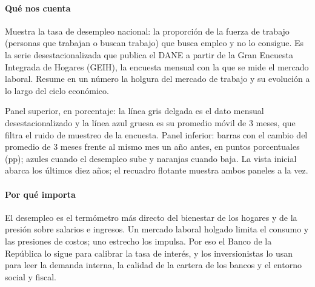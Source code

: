 \paragraph{Qué nos cuenta}
Muestra la tasa de desempleo nacional: la proporción de la fuerza de trabajo (personas que trabajan o buscan trabajo) que busca empleo y no lo consigue. Es la serie desestacionalizada que publica el DANE a partir de la Gran Encuesta Integrada de Hogares (GEIH), la encuesta mensual con la que se mide el mercado laboral. Resume en un número la holgura del mercado de trabajo y su evolución a lo largo del ciclo económico.

\begin{leer}
Panel superior, en porcentaje: la línea gris delgada es el dato mensual desestacionalizado y la línea azul gruesa es su promedio móvil de 3 meses, que filtra el ruido de muestreo de la encuesta. Panel inferior: barras con el cambio del promedio de 3 meses frente al mismo mes un año antes, en puntos porcentuales (pp); azules cuando el desempleo sube y naranjas cuando baja. La vista inicial abarca los últimos diez años; el recuadro flotante muestra ambos paneles a la vez.
\end{leer}

\paragraph{Por qué importa}
El desempleo es el termómetro más directo del bienestar de los hogares y de la presión sobre salarios e ingresos. Un mercado laboral holgado limita el consumo y las presiones de costos; uno estrecho los impulsa. Por eso el Banco de la República lo sigue para calibrar la tasa de interés, y los inversionistas lo usan para leer la demanda interna, la calidad de la cartera de los bancos y el entorno social y fiscal.

